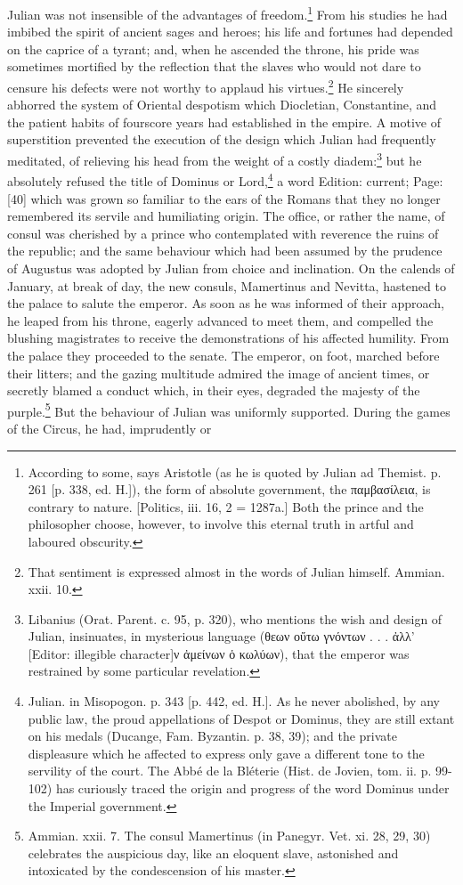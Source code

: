 Julian was not insensible of the advantages of freedom.\footnote{According to some, says Aristotle (as he is quoted by Julian ad Themist. p. 261 [p. 338, ed. H.]), the form of absolute government, the \textgreek{παμβασίλεια}, is contrary to nature. [Politics, iii. 16, 2 = 1287a.] Both the prince and the philosopher choose, however, to involve this eternal truth in artful and laboured obscurity.} From his studies he had imbibed the spirit of ancient sages and heroes; his life and fortunes had depended on the caprice of a tyrant; and, when he ascended the throne, his pride was sometimes mortified by the reflection that the slaves who would not dare to censure his defects were not worthy to applaud his virtues.\footnote{That sentiment is expressed almost in the words of Julian himself. Ammian. xxii. 10.} He sincerely abhorred the system of Oriental despotism which Diocletian, Constantine, and the patient habits of fourscore years had established in the empire. A motive of superstition prevented the execution of the design which Julian had frequently meditated, of relieving his head from the weight of a costly diadem:\footnote{Libanius (Orat. Parent. c. 95, p. 320), who mentions the wish and design of Julian, insinuates, in mysterious language (\textgreek{θεων ο\texthebrew{ὔ}τω γνόντων . . . \texthebrew{ἀ}λλ}\texthebrew{}’ [Editor: illegible character]\textgreek{ν \texthebrew{ἀ}μείνων \texthebrew{ὁ} κωλύων}), that the emperor was restrained by some particular revelation.} but he absolutely refused the title of Dominus or Lord,\footnote{Julian. in Misopogon. p. 343 [p. 442, ed. H.]. As he never abolished, by any public law, the proud appellations of Despot or Dominus, they are still extant on his medals (Ducange, Fam. Byzantin. p. 38, 39); and the private displeasure which he affected to express only gave a different tone to the servility of the court. The Abbé de la Bléterie (Hist. de Jovien, tom. ii. p. 99-102) has curiously traced the origin and progress of the word Dominus under the Imperial government.} a word Edition: current; Page: [40] which was grown so familiar to the ears of the Romans that they no longer remembered its servile and humiliating origin. The office, or rather the name, of consul was cherished by a prince who contemplated with reverence the ruins of the republic; and the same behaviour which had been assumed by the prudence of Augustus was adopted by Julian from choice and inclination. On the calends of January, at break of day, the new consuls, Mamertinus and Nevitta, hastened to the palace to salute the emperor. As soon as he was informed of their approach, he leaped from his throne, eagerly advanced to meet them, and compelled the blushing magistrates to receive the demonstrations of his affected humility. From the palace they proceeded to the senate. The emperor, on foot, marched before their litters; and the gazing multitude admired the image of ancient times, or secretly blamed a conduct which, in their eyes, degraded the majesty of the purple.\footnote{Ammian. xxii. 7. The consul Mamertinus (in Panegyr. Vet. xi. 28, 29, 30) celebrates the auspicious day, like an eloquent slave, astonished and intoxicated by the condescension of his master.} But the behaviour of Julian was uniformly supported. During the games of the Circus, he had, imprudently or 